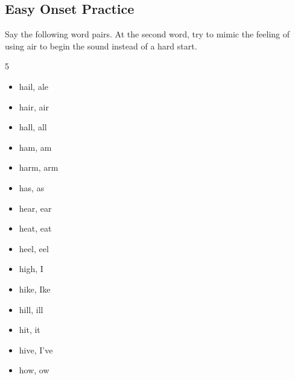 \documentclass{article}
\begin{document}
\subsection*{Easy Onset Practice}
Say the following word pairs.
At the second word, try to mimic the feeling of using air to begin the sound instead of a hard start.
\begin{multicols}{5}
    \begin{center}
        \begin{itemize}
            \item hail, ale
            \item hair, air
            \item hall, all
            \item ham, am
            \item harm, arm
            \item has, as
            \item hear, ear
            \item heat, eat
            \item heel, eel
            \item high, I
            \item hike, Ike
            \item hill, ill
            \item hit, it
            \item hive, I've
            \item how, ow
        \end{itemize}
    \end{center}
\end{multicols}
\end{document}
